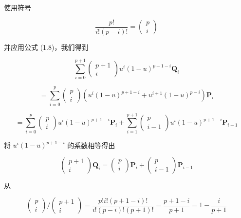 \documentclass[../main.tex]{subfiles}
\begin{document}
使用符号

\[
\frac{p!}{i!\left( {p - i}\right) !} = \left( \begin{array}{l} p \\  i \end{array}\right)
\]

并应用公式 (1.8)，我们得到

\[
\mathop{\sum }\limits_{{i = 0}}^{{p + 1}}\left( \begin{matrix} p + 1 \\  i \end{matrix}\right) {u}^{i}{\left( 1 - u\right) }^{p + 1 - i}{\mathbf{Q}}_{i}
\]

\[
= \mathop{\sum }\limits_{{i = 0}}^{p}\left( \begin{matrix} p \\  i \end{matrix}\right) \left( {{u}^{i}{\left( 1 - u\right) }^{p + 1 - i} + {u}^{i + 1}{\left( 1 - u\right) }^{p - i}}\right) {\mathbf{P}}_{i}
\]

\[
= \mathop{\sum }\limits_{{i = 0}}^{p}\left( \begin{matrix} p \\  i \end{matrix}\right) {u}^{i}{\left( 1 - u\right) }^{p + 1 - i}{\mathbf{P}}_{i} + \mathop{\sum }\limits_{{i = 1}}^{{p + 1}}\left( \begin{matrix} p \\  i - 1 \end{matrix}\right) {u}^{i}{\left( 1 - u\right) }^{p + 1 - i}{\mathbf{P}}_{i - 1}
\]

将 \({u}^{i}{\left( 1 - u\right) }^{p + 1 - i}\) 的系数相等得出

\[
\left( \begin{matrix} p + 1 \\  i \end{matrix}\right) {\mathbf{Q}}_{i} = \left( \begin{matrix} p \\  i \end{matrix}\right) {\mathbf{P}}_{i} + \left( \begin{matrix} p \\  i - 1 \end{matrix}\right) {\mathbf{P}}_{i - 1}
\]

从

\[
\left( \begin{matrix} p \\  i \end{matrix}\right) /\left( \begin{matrix} p + 1 \\  i \end{matrix}\right)  = \frac{p!i!\left( {p + 1 - i}\right) !}{i!\left( {p - i}\right) !\left( {p + 1}\right) !} = \frac{p + 1 - i}{p + 1} = 1 - \frac{i}{p + 1}
\]
\end{document}

